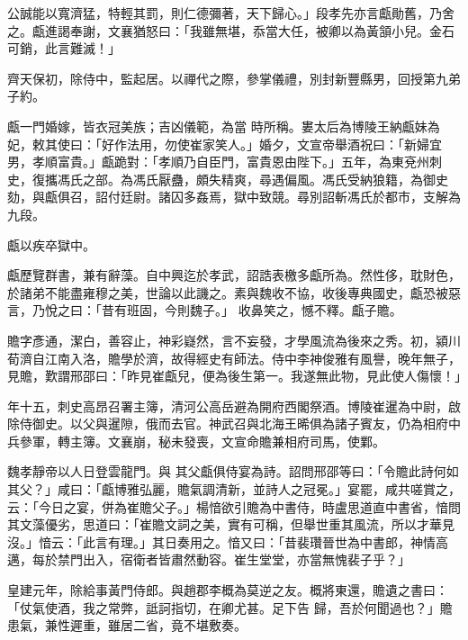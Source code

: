 \begin{pinyinscope}
 公誠能以寬濟猛，特輕其罰，則仁德彌著，天下歸心。」段孝先亦言甗勛舊，乃舍之。甗進謁奉謝，文襄猶怒曰：「我雖無堪，忝當大任，被卿以為黃頷小兒。金石可銷，此言難滅！」



 齊天保初，除侍中，監起居。以禪代之際，參掌儀禮，別封新豐縣男，回授第九弟子約。



 甗一門婚嫁，皆衣冠美族；吉凶儀範，為當
 時所稱。婁太后為博陵王納甗妹為妃，敕其使曰：「好作法用，勿使崔家笑人。」婚夕，文宣帝舉酒祝曰：「新婦宜男，孝順富貴。」甗跪對：「孝順乃自臣門，富貴恩由陛下。」五年，為東兗州刺史，復攜馮氏之部。為馮氏厭蠱，頗失精爽，尋遇偏風。馮氏受納狼籍，為御史劾，與甗俱召，詔付廷尉。諸囚多姦焉，獄中致競。尋別詔斬馮氏於都市，支解為九段。



 甗以疾卒獄中。



 甗歷覽群書，兼有辭藻。自中興迄於孝武，詔誥表檄多甗所為。然性侈，耽財色，於諸弟不能盡雍穆之美，世論以此譏之。素與魏收不協，收後專典國史，甗恐被惡言，乃悅之曰：「昔有班固，今則魏子。」
 收鼻笑之，憾不釋。甗子贍。



 贍字彥通，潔白，善容止，神彩嶷然，言不妄發，才學風流為後來之秀。初，潁川荀濟自江南入洛，贍學於濟，故得經史有師法。侍中李神俊雅有風譽，晚年無子，見贍，歎謂邢邵曰：「昨見崔甗兒，便為後生第一。我遂無此物，見此使人傷懷！」



 年十五，刺史高昂召署主簿，清河公高岳避為開府西閣祭酒。博陵崔暹為中尉，啟除侍御史。以父與暹隙，俄而去官。神武召與北海王晞俱為諸子賓友，仍為相府中兵參軍，轉主簿。文襄崩，秘未發喪，文宣命贍兼相府司馬，使鄴。



 魏孝靜帝以人日登雲龍門。與
 其父甗俱侍宴為詩。詔問邢邵等曰：「令贍此詩何如其父？」咸曰：「甗博雅弘麗，贍氣調清新，並詩人之冠冕。」宴罷，咸共嗟賞之，云：「今日之宴，併為崔贍父子。」楊愔欲引贍為中書侍，時盧思道直中書省，愔問其文藻優劣，思道曰：「崔贍文詞之美，實有可稱，但舉世重其風流，所以才華見沒。」愔云：「此言有理。」其日奏用之。愔又曰：「昔裴瓚晉世為中書郎，神情高邁，每於禁門出入，宿衛者皆肅然動容。崔生堂堂，亦當無愧裴子乎？」



 皇建元年，除給事黃門侍郎。與趙郡李概為莫逆之友。概將東還，贍遺之書曰：「仗氣使酒，我之常弊，詆訶指切，在卿尤甚。足下告
 歸，吾於何聞過也？」贍患氣，兼性遲重，雖居二省，竟不堪敷奏。




\end{pinyinscope}

